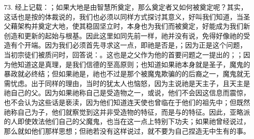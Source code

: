 73. 经上记载：；如果大地是由智慧所奠定，那么奠定者又如何被奠定呢？其实，这话也是按的体裁说的，我们也必须以同样方式探讨其意义，好叫我们知道，当圣父藉架构并奠定大地，使其稳固坚立时，本身也为我们而被奠定，好能成为我们新创造和更新的起始与根基。因此这里如同先前一样，祂并没有说，免得好像祂的受造有个开端。因为我们必须首先寻求这一点，即祂是否是，；因为正是这个问题，当初宗徒们被质问时，回答说：。这也是之父作为他的首要问题之一提出的；；因为他知道这是真理，是我们信德的至高原则；也知道如果祂本身就是圣子，魔鬼的暴政就必终结；但如果祂是，祂也不过是那个被魔鬼欺骗的的后裔之一，魔鬼就无需忧虑。出于同样的理由，当时的犹太人也恼怒，因为主说祂是天主子，且天主是祂自己的父。因为如果祂称自己是受造物之一，或说，他们不会因这信息而震惊，也不会认为这些话是亵渎，因为他们知道连天使也曾临在于他们的祖先中；但既然祂称自己为子，他们就察觉到这并非受造物的特征，而是与的特征。因此，亚略派的人即使效法他们自己的父魔鬼，也当在这一点上特别下功夫；如果祂曾经说过，那么就如他们那样思想；但祂若没有这样说过，就不要为自己捏造无中生有的事。\par

